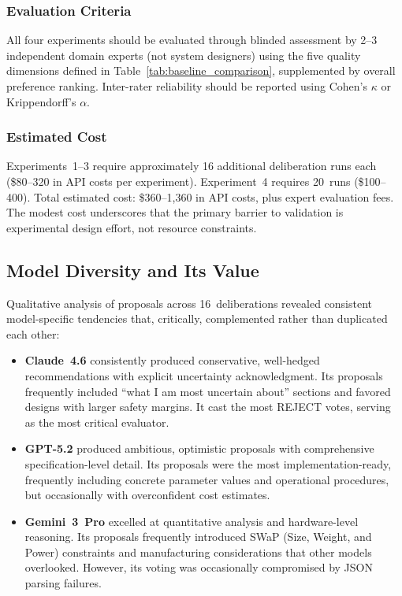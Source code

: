 \documentclass[11pt,a4paper]{article}
\begin{document}
\subsubsection{Evaluation Criteria}

All four experiments should be evaluated through blinded assessment by 2--3 independent domain experts (not system designers) using the five quality dimensions defined in Table~\ref{tab:baseline_comparison}, supplemented by overall preference ranking. Inter-rater reliability should be reported using Cohen's $\kappa$ or Krippendorff's $\alpha$.

\subsubsection{Estimated Cost}

Experiments~1--3 require approximately 16 additional deliberation runs each (\$80--320 in API costs per experiment). Experiment~4 requires 20~runs (\$100--400). Total estimated cost: \$360--1{,}360 in API costs, plus expert evaluation fees. The modest cost underscores that the primary barrier to validation is experimental design effort, not resource constraints.

\subsection{Model Diversity and Its Value}

Qualitative analysis of proposals across 16~deliberations revealed consistent model-specific tendencies that, critically, complemented rather than duplicated each other:

\begin{itemize}[nosep]
    \item \textbf{Claude~4.6} consistently produced conservative, well-hedged recommendations with explicit uncertainty acknowledgment. Its proposals frequently included ``what I am most uncertain about'' sections and favored designs with larger safety margins. It cast the most REJECT votes, serving as the most critical evaluator.
    \item \textbf{GPT-5.2} produced ambitious, optimistic proposals with comprehensive specification-level detail. Its proposals were the most implementation-ready, frequently including concrete parameter values and operational procedures, but occasionally with overconfident cost estimates.
    \item \textbf{Gemini~3~Pro} excelled at quantitative analysis and hardware-level reasoning. Its proposals frequently introduced SWaP (Size, Weight, and Power) constraints and manufacturing considerations that other models overlooked. However, its voting was occasionally compromised by JSON parsing failures.
\end{itemize}
\end{document}
